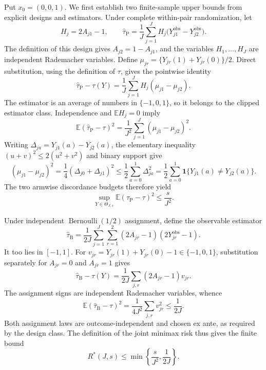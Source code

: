 Put \(x_0=(0,0,1)\).  We first establish two finite-sample upper bounds from explicit designs and estimators.  Under complete within-pair randomization, let
\[
 H_j=2A_{j1}-1,
 \qquad
 \widehat\tau_{\mathrm P}
 =\frac1J\sum_{j=1}^J
 H_j\bigl(Y^{\mathrm{obs}}_{j1}-Y^{\mathrm{obs}}_{j2}\bigr).
\]
The definition of this design gives \(A_{j2}=1-A_{j1}\), and the variables \(H_1,\ldots,H_J\) are independent Rademacher variables.  Define
\(
 \mu_{jr}=\{Y_{jr}(1)+Y_{jr}(0)\}/2
\).
Direct substitution, using the definition of \(\tau\), gives the pointwise identity
\[
 \widehat\tau_{\mathrm P}-\tau(Y)
 =\frac1J\sum_{j=1}^J H_j(\mu_{j1}-\mu_{j2}).
\]
The estimator is an average of numbers in \(\{-1,0,1\}\), so it belongs to the clipped estimator class.  Independence and \(\mathbb E H_j=0\) imply
\[
 \mathbb E(\widehat\tau_{\mathrm P}-\tau)^2
 =\frac1{J^2}\sum_{j=1}^J(\mu_{j1}-\mu_{j2})^2.
\]
Writing \(\Delta_{ja}=Y_{j1}(a)-Y_{j2}(a)\), the elementary inequality \((u+v)^2\le 2(u^2+v^2)\) and binary support give
\[
 (\mu_{j1}-\mu_{j2})^2
 =\frac14(\Delta_{j0}+\Delta_{j1})^2
 \le \frac12\sum_{a=0}^1\Delta_{ja}^2
 =\frac12\sum_{a=0}^1
 \mathbf 1\{Y_{j1}(a)\ne Y_{j2}(a)\}.
\]
The two armwise discordance budgets therefore yield
\[
 \sup_{Y\in\Theta_{J,s}}
 \mathbb E(\widehat\tau_{\mathrm P}-\tau)^2
 \le \frac{s}{J^2}.
\]

Under independent \(\operatorname{Bernoulli}(1/2)\) assignment, define the observable estimator
\[
 \widehat\tau_{\mathrm B}
 =\frac1{2J}\sum_{j=1}^J\sum_{r=1}^2
 (2A_{jr}-1)(2Y^{\mathrm{obs}}_{jr}-1).
\]
It too lies in \([-1,1]\).  For
\(
 v_{jr}=Y_{jr}(1)+Y_{jr}(0)-1\in\{-1,0,1\}
\), substitution separately for \(A_{jr}=0\) and \(A_{jr}=1\) gives
\[
 \widehat\tau_{\mathrm B}-\tau(Y)
 =\frac1{2J}\sum_{j,r}(2A_{jr}-1)v_{jr}.
\]
The assignment signs are independent Rademacher variables, whence
\[
 \mathbb E(\widehat\tau_{\mathrm B}-\tau)^2
 =\frac1{4J^2}\sum_{j,r}v_{jr}^2
 \le\frac1{2J}.
\]
Both assignment laws are outcome-independent and chosen ex ante, as required by the design class.  The definition of the joint minimax risk thus gives the finite bound
\[
 R^*(J,s)\le \min\left\{\frac{s}{J^2},\frac1{2J}\right\}.
 \tag{1}
\]

